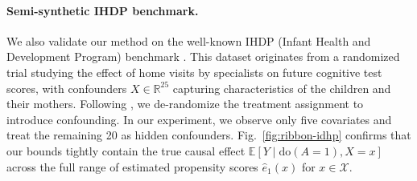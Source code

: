 \paragraph{Semi-synthetic IHDP benchmark.} We also validate our method on the well-known IHDP (Infant Health and Development Program) benchmark \citep{hill2011bayesian,louizos2017causal,amlab_cevae_github2020}. This dataset originates from a randomized trial studying the effect of home visits by specialists on future cognitive test scores, with confounders $X \in \mathbb{R}^{25}$ capturing characteristics of the children and their mothers. Following \citet{louizos2017causal}, we de-randomize the treatment assignment to introduce confounding. In our experiment, we observe only five covariates and treat the remaining 20 as hidden confounders. Fig.~\ref{fig:ribbon-idhp} confirms that our bounds tightly contain the true causal effect $\mathbb{E}[Y \mid \mathrm{do}(A=1),X=x]$ across the full range of estimated propensity scores $\widehat{e}_1(x)$ for $x \in \mathcal{X}$.



